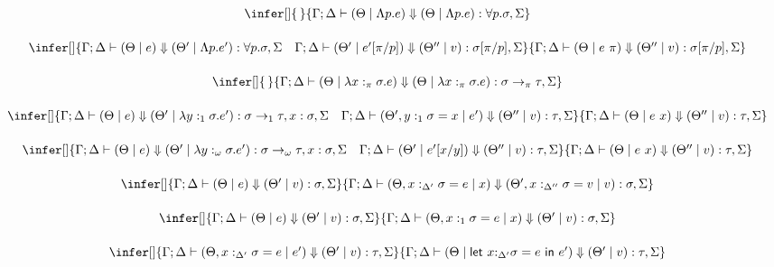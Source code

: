 \documentclass[acmsmall,review,anonymous,screen]{acmart}
\newcommand{\llet}[2]{\mathsf{let}~#1~\mathsf{in}~#2}
\begin{document}
\begin{figure}
\[
  \begin{array}{c}
    \infer[]
    {\,}
    {\Gamma;\Delta \vdash (\Theta \mid \Lambda p.e) \Downarrow (\Theta \mid
    \Lambda p.e) : \forall p . \sigma , \Sigma }
    \\[1.5em]
    \infer[]
    {\Gamma ; \Delta \vdash (\Theta \mid  e) \Downarrow (\Theta' \mid
    \Lambda p.e') : \forall p . \sigma , \Sigma \quad \Gamma ;\Delta \vdash
      (\Theta' \mid e'[\pi/p]) \Downarrow (\Theta'' \mid v) : \sigma[\pi/p], \Sigma}
    {\Gamma ; \Delta \vdash (\Theta \mid e~\pi) \Downarrow (\Theta''
      \mid v) : \sigma[\pi/p] , \Sigma  }\\[1.5em]
    \infer[]
    {\,}
    {\Gamma ;\Delta \vdash (\Theta \mid \lambda x:_\pi \sigma . e)
    \Downarrow (\Theta \mid \lambda x:_\pi\sigma .e) : \sigma
    \rightarrow_\pi \tau,\Sigma }\\[1.5em]
    \infer[]
    {\Gamma;\Delta \vdash  (\Theta \mid e) \Downarrow (\Theta' \mid
    \lambda y:_1 \sigma . e') : \sigma \rightarrow_1 \tau , x:\sigma, \Sigma
    \quad
    \Gamma ; \Delta \vdash (\Theta' , y:_{1} \sigma = x \mid e') \Downarrow (\Theta''
    \mid v) : \tau , \Sigma  }
    {\Gamma ; \Delta\vdash (\Theta \mid  e~x ) \Downarrow (\Theta''
    \mid v) : \tau , \Sigma }\\[1.5em]
           \infer[]
    {\Gamma;\Delta \vdash  (\Theta \mid e) \Downarrow (\Theta' \mid
    \lambda y:_\omega \sigma . e') : \sigma \rightarrow_\omega \tau , x:\sigma, \Sigma
    \quad
            \Gamma ; \Delta \vdash (\Theta' \mid e'[x/y]) \Downarrow (\Theta''
    \mid v) : \tau , \Sigma  }
    {\Gamma ; \Delta\vdash (\Theta \mid  e~x ) \Downarrow (\Theta''
    \mid v) : \tau , \Sigma }\\[1.5em]
     
       \infer[]
    {\Gamma ; \Delta  \vdash (\Theta \mid e)
    \Downarrow (\Theta' \mid v) : \sigma , \Sigma}
    {\Gamma ; \Delta \vdash (\Theta , x:_{\Delta'} \sigma = e \mid x)
      \Downarrow (\Theta' , x:_{\Delta''} \sigma = v \mid v) : \sigma, \Sigma}
    \\[1.5em]
           \infer[]
    {\Gamma ;\Delta  \vdash (\Theta \mid e)
    \Downarrow (\Theta' \mid v) : \sigma,\Sigma}
    {\Gamma ; \Delta \vdash (\Theta , x:_1 \sigma = e \mid x)
    \Downarrow (\Theta' \mid v) : \sigma,\Sigma}
    \\[1.5em]
    
    \infer[]
    {\Gamma ;\Delta \vdash (\Theta,x:_{\Delta'} \sigma = e \mid e')
    \Downarrow (\Theta' \mid v) : \tau,\Sigma}
    {\Gamma ; \Delta \vdash (\Theta \mid \llet{x{:}_{\Delta'}\sigma =
    e}{e'})\Downarrow (\Theta' \mid v) : \tau , \Sigma
    }\\[1.5em]
    

\end{array}\]
\end{figure}
\end{document}
